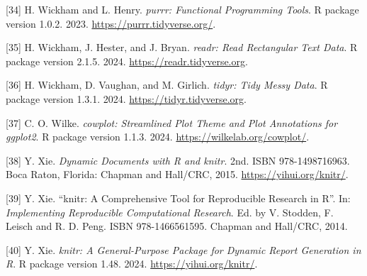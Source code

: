 \documentclass[
  letterpaper,
  DIV=11,
  numbers=noendperiod]{scrreprt}
\begin{document}
{[}34{]} H. Wickham and L. Henry. \emph{purrr: Functional Programming
Tools}. R package version 1.0.2. 2023.
\url{https://purrr.tidyverse.org/}.

{[}35{]} H. Wickham, J. Hester, and J. Bryan. \emph{readr: Read
Rectangular Text Data}. R package version 2.1.5. 2024.
\url{https://readr.tidyverse.org}.

{[}36{]} H. Wickham, D. Vaughan, and M. Girlich. \emph{tidyr: Tidy Messy
Data}. R package version 1.3.1. 2024. \url{https://tidyr.tidyverse.org}.

{[}37{]} C. O. Wilke. \emph{cowplot: Streamlined Plot Theme and Plot
Annotations for ggplot2}. R package version 1.1.3. 2024.
\url{https://wilkelab.org/cowplot/}.

{[}38{]} Y. Xie. \emph{Dynamic Documents with R and knitr}. 2nd. ISBN
978-1498716963. Boca Raton, Florida: Chapman and Hall/CRC, 2015.
\url{https://yihui.org/knitr/}.

{[}39{]} Y. Xie. ``knitr: A Comprehensive Tool for Reproducible Research
in R''. In: \emph{Implementing Reproducible Computational Research}. Ed.
by V. Stodden, F. Leisch and R. D. Peng. ISBN 978-1466561595. Chapman
and Hall/CRC, 2014.

{[}40{]} Y. Xie. \emph{knitr: A General-Purpose Package for Dynamic
Report Generation in R}. R package version 1.48. 2024.
\url{https://yihui.org/knitr/}.
\end{document}
